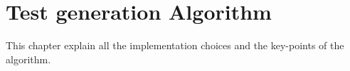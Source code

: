 \chapter{Test generation Algorithm}\label{ch:testGenAlg}
This chapter explain all the implementation choices and the key-points of the algorithm.






\newpage